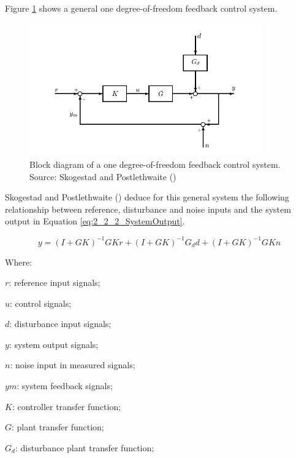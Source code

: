 Figure \ref{fig:2_2_2_SystemBlockDiagram} shows a general one degree-of-freedom feedback control system.

\begin{figure}[H]
	\centering
	\centerline{\includegraphics[width=0.9\textwidth]{Figuras/2.TheoryBackground/2-2-2-SystemBlockDiagram.jpg}}
	\caption{Block diagram of a one degree-of-freedom feedback control system. Source: Skogestad and Postlethwaite (\citeyear{Skogestad})}
	\label{fig:2_2_2_SystemBlockDiagram}
\end{figure}

Skogestad and Postlethwaite (\citeyear{Skogestad}) deduce for this general system the following relationship between reference, disturbance and noise inputs and the system output in Equation \ref{eq:2_2_2_SystemOutput}.

\begin{equation}
\label{eq:2_2_2_SystemOutput}
y = (I + GK)^{-1}GKr + (I + GK)^{-1}G_{d}d + (I+GK)^{-1}GKn
\end{equation}

Where:

\begin{description}
	\item \hspace{20pt}$r$: reference input signals;
	\item \hspace{20pt}$u$: control signals;
	\item \hspace{20pt}$d$: disturbance input signals;
	\item \hspace{20pt}$y$: system output signals;
	\item \hspace{20pt}$n$: noise input in measured signals;
	\item \hspace{20pt}$ym$: system feedback signals;
	\item \hspace{20pt}$K$: controller transfer function;
	\item \hspace{20pt}$G$: plant transfer function;
	\item \hspace{20pt}$G_d$: disturbance plant transfer function;
\end{description}

